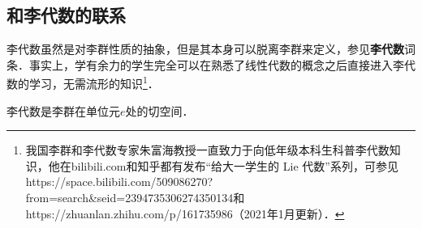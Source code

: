 \subsection{和李代数的联系}

李代数虽然是对李群性质的抽象，但是其本身可以脱离李群来定义，参见\textbf{李代数}词条．事实上，学有余力的学生完全可以在熟悉了线性代数的概念之后直接进入李代数的学习，无需流形的知识\footnote{我国李群和李代数专家朱富海教授一直致力于向低年级本科生科普李代数知识，他在bilibili.com和知乎都有发布“给大一学生的 Lie 代数”系列，可参见https://space.bilibili.com/509086270?from=search&seid=2394735306274350134和https://zhuanlan.zhihu.com/p/161735986（2021年1月更新）．}．

李代数是李群在单位元$e$处的切空间．




